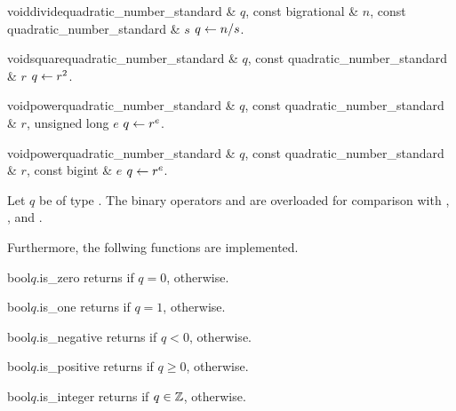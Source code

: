 \begin{fcode}{void}{divide}{quadratic_number_standard & $q$, const bigrational & $n$,
    const quadratic_number_standard & $s$}%
  $q \leftarrow n / s$.
\end{fcode}

\begin{fcode}{void}{square}{quadratic_number_standard & $q$, const quadratic_number_standard & $r$}
  $q \leftarrow r^2$.
\end{fcode}

\begin{fcode}{void}{power}{quadratic_number_standard & $q$, const quadratic_number_standard & $r$,
    unsigned long $e$}%
  $q \leftarrow r^e$.
\end{fcode}

\begin{fcode}{void}{power}{quadratic_number_standard & $q$, const quadratic_number_standard & $r$,
    const bigint & $e$}%
  $q \leftarrow r^e$.
\end{fcode}



\COMP

Let $q$ be of type .  The binary operators \code{==} and
\code{!=} are overloaded for comparison with ,
, and .

Furthermore, the follwing functions are implemented.

\begin{cfcode}{bool}{$q$.is_zero}{}
  returns \TRUE if $q = 0$, \FALSE otherwise.
\end{cfcode}

\begin{cfcode}{bool}{$q$.is_one}{}
  returns \TRUE if $q = 1$, \FALSE otherwise.
\end{cfcode}

\begin{cfcode}{bool}{$q$.is_negative}{}
  returns \TRUE if $q < 0$, \FALSE otherwise.
\end{cfcode}

\begin{cfcode}{bool}{$q$.is_positive}{}
  returns \TRUE if $q \geq 0$, \FALSE otherwise.
\end{cfcode}

\begin{cfcode}{bool}{$q$.is_integer}{}
  returns \TRUE if $q \in \mathbb{Z}$, \FALSE otherwise.
\end{cfcode}

